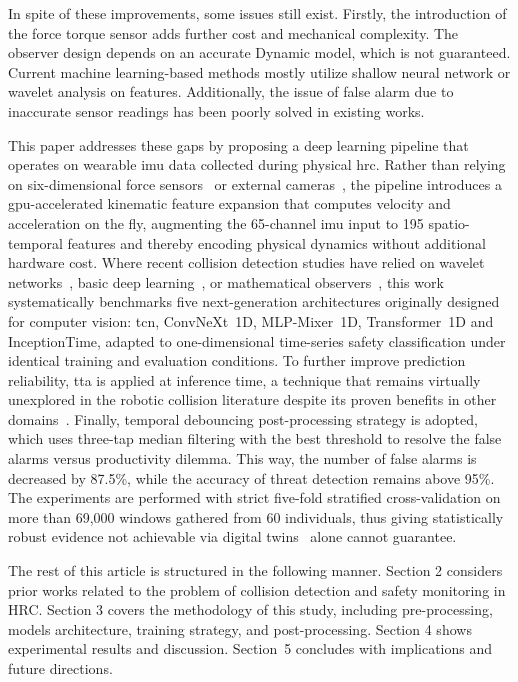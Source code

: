 \documentclass[pdflatex,sn-mathphys-num]{sn-jnl}%
\begin{document}
In spite of these improvements, some issues still exist. Firstly, the introduction of the force torque sensor adds further cost and mechanical complexity. The observer design depends on an accurate Dynamic model, which is not guaranteed. Current machine learning-based methods mostly utilize shallow neural network or wavelet analysis on features. Additionally, the issue of false alarm due to inaccurate sensor readings has been poorly solved in existing works.

This paper addresses these gaps by proposing a deep learning pipeline that operates on wearable \ac{imu} data collected during physical \ac{hrc}. Rather than relying on six-dimensional force sensors~\cite{wang2025sixdof} or external cameras~\cite{hoang2024grasp}, the pipeline introduces a \ac{gpu}-accelerated kinematic feature expansion that computes velocity and acceleration on the fly, augmenting the 65-channel \ac{imu} input to 195 spatio-temporal features and thereby encoding physical dynamics without additional hardware cost. Where recent collision detection studies have relied on wavelet networks~\cite{niu2024wavelet}, basic deep learning~\cite{zhao2025zeroforce}, or mathematical observers~\cite{tonti2024eso}, this work systematically benchmarks five next-generation architectures originally designed for computer vision: \ac{tcn}, ConvNeXt~1D, MLP-Mixer~1D, Transformer~1D and InceptionTime, adapted to one-dimensional time-series safety classification under identical training and evaluation conditions. To further improve prediction reliability, \ac{tta} is applied at inference time, a technique that remains virtually unexplored in the robotic collision literature despite its proven benefits in other domains~\cite{fang2024multivariate}. Finally, temporal debouncing post-processing strategy is adopted, which uses three-tap median filtering with the best threshold to resolve the false alarms versus productivity dilemma. This way, the number of false alarms is decreased by 87.5\%, while the accuracy of threat detection remains above 95\%. The experiments are performed with strict five-fold stratified cross-validation on more than 69,000 windows gathered from 60 individuals, thus giving statistically robust evidence not achievable via digital twins~\cite{an2024digitaltwin} alone cannot guarantee.

The rest of this article is structured in the following manner. Section 2 considers prior works related to the problem of collision detection and safety monitoring in HRC. Section 3 covers the methodology of this study, including pre-processing, models architecture, training strategy, and post-processing. Section 4 shows experimental results and discussion. Section~5 concludes with implications and future directions.
\end{document}
